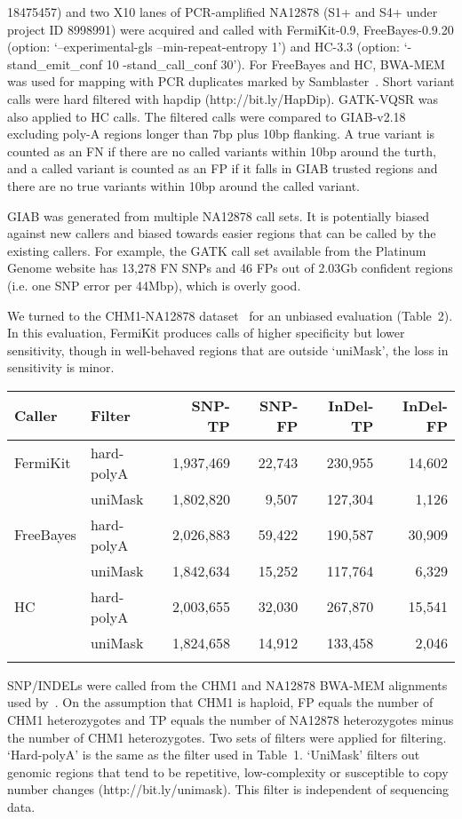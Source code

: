 \documentclass{bioinfo}
\begin{document}
\begin{table}[htb]
{18475457) and two X10 lanes of PCR-amplified NA12878 (S1+ and S4+ under project
ID 8998991) were acquired and called with FermiKit-0.9, FreeBayes-0.9.20
(option: `--experimental-gls --min-repeat-entropy
1') and HC-3.3 (option: `-stand\_emit\_conf 10 -stand\_call\_conf 30'). For
FreeBayes and HC, BWA-MEM was used for mapping with PCR duplicates marked by
Samblaster~\citep{Faust:2014aa}.  Short variant calls were hard filtered with
hapdip (http://bit.ly/HapDip). GATK-VQSR was also applied
to HC calls. The filtered calls were compared to
GIAB-v2.18 excluding poly-A regions longer than 7bp plus 10bp flanking. A
true variant is counted as an FN if there are no called variants within 10bp
around the turth, and a called variant is counted as an FP if it falls in GIAB
trusted regions and there are no true variants within 10bp around the called
variant.}
\end{table}

GIAB was generated from multiple NA12878 call sets. It is potentially biased
against new callers and biased towards easier regions that can be called by the
existing callers. For example, the GATK call set available from the Platinum
Genome website has 13,278 FN SNPs and 46 FPs out of 2.03Gb confident regions
(i.e. one SNP error per 44Mbp), which is overly good.

We turned to the CHM1-NA12878 dataset~\citep{Li:2014aa} for an unbiased
evaluation (Table~2). In this evaluation, FermiKit produces calls of higher
specificity but lower sensitivity, though in well-behaved regions that are
outside `uniMask', the loss in sensitivity is minor.

\begin{table}[htb]
{\footnotesize
\begin{tabular}{llrrrr}
\toprule
Caller   & Filter     & SNP-TP    & SNP-FP & InDel-TP & InDel-FP \\
\midrule
FermiKit & hard-polyA & 1,937,469 & 22,743 & 230,955 & 14,602 \\
         & uniMask    & 1,802,820 & 9,507  & 127,304 & 1,126 \\
FreeBayes& hard-polyA & 2,026,883 & 59,422 & 190,587 & 30,909 \\
         & uniMask    & 1,842,634 & 15,252 & 117,764 & 6,329 \\
HC       & hard-polyA & 2,003,655 & 32,030 & 267,870 & 15,541 \\
         & uniMask    & 1,824,658 & 14,912 & 133,458 & 2,046 \\
\botrule
\end{tabular}}{SNP/INDELs were called from the CHM1 and NA12878 BWA-MEM
alignments used by~\citet{Li:2014aa}. On the assumption that CHM1 is haploid,
FP equals the number of CHM1 heterozygotes and TP equals the number of NA12878
heterozygotes minus the number of CHM1 heterozygotes. Two sets of filters were
applied for filtering. `Hard-polyA' is the same as the filter used in Table~1.
`UniMask' filters out genomic regions that tend to be repetitive,
low-complexity or susceptible to copy number changes (http://bit.ly/unimask).
This filter is independent of sequencing data.}
\end{table}
\end{document}
